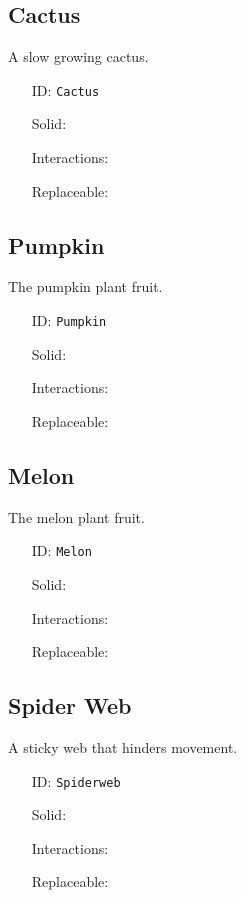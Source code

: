 \subsection{Cactus}\label{subsec:blocks_cactus}
A slow growing cactus.
\newline
\begin{itemize}[nosep]
    \item[ID:] \texttt{Cactus}
    \item[Solid:]  \Checkmark \item[Interactions:]  \XSolidBrush \item[Replaceable:]  \XSolidBrush
\end{itemize}

\subsection{Pumpkin}\label{subsec:blocks_pumpkin}
The pumpkin plant fruit.
\newline
\begin{itemize}[nosep]
    \item[ID:] \texttt{Pumpkin}
    \item[Solid:]  \Checkmark \item[Interactions:]  \XSolidBrush \item[Replaceable:]  \XSolidBrush
\end{itemize}

\subsection{Melon}\label{subsec:blocks_melon}
The melon plant fruit.
\newline
\begin{itemize}[nosep]
    \item[ID:] \texttt{Melon}
    \item[Solid:]  \Checkmark \item[Interactions:]  \XSolidBrush \item[Replaceable:]  \XSolidBrush
\end{itemize}

\subsection{Spider Web}\label{subsec:blocks_spider web}
A sticky web that hinders movement.
\newline
\begin{itemize}[nosep]
    \item[ID:] \texttt{Spiderweb}
    \item[Solid:]  \XSolidBrush \item[Interactions:]  \XSolidBrush \item[Replaceable:]  \XSolidBrush
\end{itemize}

